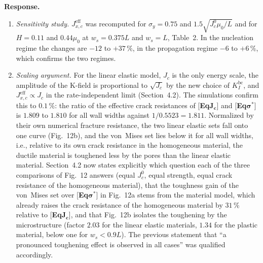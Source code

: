 \documentclass[pdflatex,sn-mathphys-num]{sn-jnl}
\newcommand{\EqJcLabel}{[\textbf{Eq$\boldsymbol{J_c}$}]\xspace}
\newcommand{\EqSigmaStarLabel}{[\textbf{Eq$\boldsymbol{\sigma^*}$}]\xspace}
\newenvironment{response}
  {\par\noindent\textbf{Response.}\ }
  {\par}
\begin{document}
\begin{response}
\begin{enumerate}
The linear elastic sets re-nucleate when $\sigma_{yy,\max}$ reaches $0.95$ to $1.02$ times the one-dimensional fracture stress of Section~3.6, for all wall widths (stress-controlled nucleation, see also minor point~24). For the von~Mises set, two regimes are identified. For $w_s \le 0.6L$ the recorded maxima indicate that the ligament yields across its width ($\alpha_{\max} \approx 0.7$, triaxiality $0.67$ to $0.74$) and re-nucleates at about the one-dimensional fracture stress after a large plastic strain, as the one-dimensional bar of Section~3.6, which is the reduced model for this regime. Yielding lowers the peak stress ahead of the pore, so that re-nucleation is reached at a lower driving force than in the linear elastic ligament of equal strength, hence the reduction of the effective crack resistance below \EqSigmaStarLabel (the mechanism is described in detail in the response to Reviewer~3, comment~1). For $w_s \ge L$ the recorded maxima indicate that the plastic zone does not span the ligament, the trapped tip acts as a constrained notch (triaxiality measure $1.0$ to $1.1$), the von~Mises stress stays at the yield stress while the normal stress reaches $1.31$ to $1.34$ times the one-dimensional fracture stress, re-nucleation is delayed and the effective crack resistance is raised. This is also consistent with the later saturation of the von~Mises set.
\item \emph{Sensitivity study.} $J_{x,c}^{\text{eff}}$ was recomputed for $\sigma_y = 0.75$ and $1.5\sqrt{J_c^0\mu_0/L}$ and for $H = 0.11$ and $0.44\mu_0$ at $w_s = 0.375L$ and $w_s = L$, Table~2. In the nucleation regime the changes are $-12$ to $+37\,\%$, in the propagation regime $-6$ to $+6\,\%$, which confirms the two regimes.
\item \emph{Scaling argument.} For the linear elastic model, $J_c$ is the only energy scale, the amplitude of the K-field is proportional to $\sqrt{J_c}$ by the new choice of $K_I^{\text{bc}}$, and $J_{x,c}^{\text{eff}} \propto J_c$ in the rate-independent limit (Section~4.2). The simulations confirm this to $0.1\,\%$: the ratio of the effective crack resistances of \EqJcLabel and \EqSigmaStarLabel is $1.809$ to $1.810$ for all wall widths against $1/0.5523 = 1.811$. Normalized by their own numerical fracture resistance, the two linear elastic sets fall onto one curve (Fig.~12b), and the von~Mises set lies below it for all wall widths, i.e., relative to its own crack resistance in the homogeneous material, the ductile material is toughened less by the pores than the linear elastic material. Section~4.2 now states explicitly which question each of the three comparisons of Fig.~12 answers (equal $J_c^0$, equal strength, equal crack resistance of the homogeneous material), that the toughness gain of the von~Mises set over \EqSigmaStarLabel in Fig.~12a stems from the material model, which already raises the crack resistance of the homogeneous material by $31\,\%$ relative to \EqJcLabel, and that Fig.~12b isolates the toughening by the microstructure (factor $2.03$ for the linear elastic materials, $1.34$ for the plastic material, below one for $w_s < 0.9L$). The previous statement that ``a pronounced toughening effect is observed in all cases'' was qualified accordingly.

\end{enumerate}
\end{response}
\end{document}
